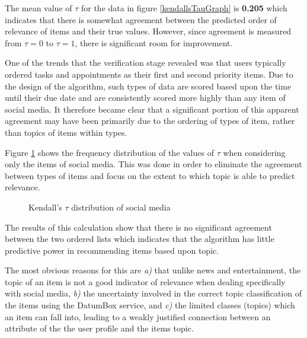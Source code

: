 The mean value of $\tau$ for the data in figure \ref{kendallsTauGraph} is \textbf{0.205} which indicates that there is somewhat agreement between the predicted order of relevance of items and their true values. However, since agreement is measured from $\tau = 0$ to $\tau = 1$, there is significant room for improvement. 

One of the trends that the verification stage revealed was that users typically ordered tasks and appointments as their first and second priority items. Due to the design of the algorithm, such types of data are scored based upon the time until their due date and are consistently scored more highly than any item of social media. It therefore became clear that a significant portion of this apparent agreement may have been primarily due to the ordering of types of item, rather than topics of items within types.

Figure \ref{kendallsTauGraph2} shows the frequency distribution of the values of $\tau$ when considering only the items of social media. This was done in order to eliminate the agreement between types of items and focus on the extent to which topic is able to predict relevance. 

\begin{figure}[ht!]
    \caption{Kendall's $\tau$ distribution of social media}
    \label{kendallsTauGraph2}
\end{figure}

The results of this calculation show that there is no significant agreement between the two ordered lists which indicates that the algorithm has little predictive power in recommending items based upon topic. 

The most obvious reasons for this are \emph{a)} that unlike news and entertainment, the topic of an item is not a good indicator of relevance when dealing specifically with social media, \emph{b)} the uncertainty involved in the correct topic classification of the items using the DatumBox service, and \emph{c)} the limited classes (topics) which an item can fall into, leading to a weakly justified connection between an attribute of the the user profile and the items topic.

